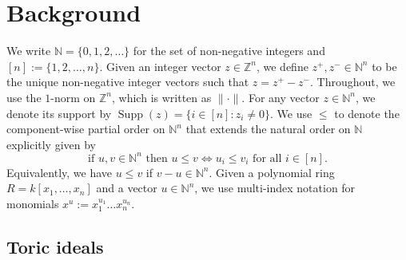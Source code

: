 \documentclass[a4paper, 12pt]{article}
\newcommand{\NN}{\mathbb N}
\newcommand{\ZZ}{\mathbb Z}
\theoremstyle{plain}
\theoremstyle{definition}
\theoremstyle{remark}
\begin{document}




\section{Background}\label{sec: background}

We write $\NN = \{0,1,2,\dots\}$ for the set of non-negative integers and $[n] := \{1,2, \dots, n\}$. Given an integer vector $z \in \ZZ^n$, we define $z^+, z^- \in \NN^n$ to be the unique non-negative integer vectors such that $z = z^+ - z^-$. Throughout, we use the $1$-norm on $\ZZ^n$, which is written as $\lVert \cdot \rVert$. For any vector $z \in \NN^n$, we denote its support by $\operatorname{Supp}(z) = \{i \in [n] : z_i \neq 0\}$. We use $\le$ to denote the component-wise partial order on $\NN^n$ that extends the natural order on $\NN$ explicitly given by
\[
\text{if }u,v \in \NN^n \text{ then } u \le v \iff u_i \le v_i \text{ for all } i \in [n].
\]
Equivalently, we have $u \le v$ if $v-u \in \NN^n$.
Given a polynomial ring $R = k[x_1, \dots, x_n]$ and a vector $u \in \NN^n$, we use multi-index notation for monomials $x^u := x_1^{u_1} \dots x_n^{u_n}$.


\subsection{Toric ideals}
\end{document}
